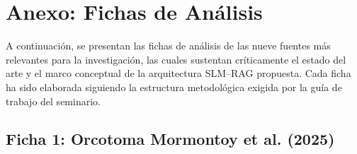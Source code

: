 \newpage
{}
{}
\section*{Anexo: Fichas de Análisis}
\label{sec:anexos}

A continuación, se presentan las fichas de análisis de las nueve fuentes más relevantes para la investigación, las cuales sustentan críticamente el estado del arte y el marco conceptual de la arquitectura SLM--RAG propuesta. Cada ficha ha sido elaborada siguiendo la estructura metodológica exigida por la guía de trabajo del seminario.

\subsection*{Ficha 1: Orcotoma Mormontoy et al. (2025)}

